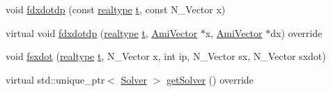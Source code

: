\begin{DoxyCompactItemize}
\item 
void \mbox{\hyperlink{classamici_1_1_model___o_d_e_a371aa66b99b1b3b20ed2e533d9b44870}{fdxdotdp}} (const \mbox{\hyperlink{namespaceamici_a1bdce28051d6a53868f7ccbf5f2c14a3}{realtype}} \mbox{\hyperlink{classamici_1_1_model_a711281d57e9710226face29151cc4641}{t}}, const N\+\_\+\+Vector x)
\item 
virtual void \mbox{\hyperlink{classamici_1_1_model___o_d_e_afd60580b84c72713288796453f6da33a}{fdxdotdp}} (\mbox{\hyperlink{namespaceamici_a1bdce28051d6a53868f7ccbf5f2c14a3}{realtype}} \mbox{\hyperlink{classamici_1_1_model_a711281d57e9710226face29151cc4641}{t}}, \mbox{\hyperlink{classamici_1_1_ami_vector}{Ami\+Vector}} $\ast$x, \mbox{\hyperlink{classamici_1_1_ami_vector}{Ami\+Vector}} $\ast$dx) override
\item 
void \mbox{\hyperlink{classamici_1_1_model___o_d_e_a786f028681b0928eb431cd44e9bd254a}{fsxdot}} (\mbox{\hyperlink{namespaceamici_a1bdce28051d6a53868f7ccbf5f2c14a3}{realtype}} \mbox{\hyperlink{classamici_1_1_model_a711281d57e9710226face29151cc4641}{t}}, N\+\_\+\+Vector x, int ip, N\+\_\+\+Vector sx, N\+\_\+\+Vector sxdot)
\item 
virtual std\+::unique\+\_\+ptr$<$ \mbox{\hyperlink{classamici_1_1_solver}{Solver}} $>$ \mbox{\hyperlink{classamici_1_1_model___o_d_e_aee7564098e889917627afd3c00772f81}{get\+Solver}} () override
\end{DoxyCompactItemize}
